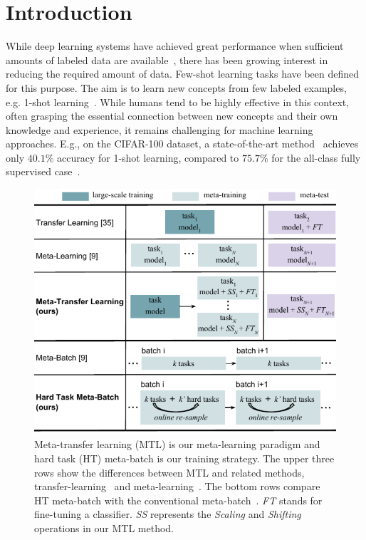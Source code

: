 \section{Introduction}

While deep learning systems have achieved great performance when sufficient amounts of labeled data are available~\cite{Lecun2015, HeZRS16, ShelhamerLD17},
there has been growing interest in reducing the required amount of data.
%
Few-shot learning tasks have been defined for this purpose. 
%
The aim is to learn new concepts from few labeled examples, e.g. 1-shot learning~\cite{FeiFeiFP06}.
%
While humans tend to be highly effective in this context, often grasping the essential connection between new concepts and their own knowledge and experience, it remains challenging for machine learning approaches.
E.g., on the CIFAR-100 dataset, a state-of-the-art method~\cite{OreshkinNIPS18} achieves only $40.1\%$ accuracy for 1-shot learning, compared to $75.7\%$ for the all-class fully supervised case~\cite{ClevertUH15}. 



\begin{figure}[t]
  \centering
  \includegraphics[width=0.99\linewidth]{figures/main_framework_tisser.pdf}
     \caption{Meta-transfer learning (MTL) is our meta-learning paradigm and hard task (HT) meta-batch is our training strategy. The upper three rows show the differences between MTL and related methods, transfer-learning~\cite{PanTKY11} and meta-learning~\cite{FinnAL17}.
     The bottom rows compare HT meta-batch with the conventional meta-batch~\cite{FinnAL17}. \emph{FT} stands for fine-tuning a classifier. \emph{SS} represents the \emph{Scaling} and \emph{Shifting} operations in our MTL method.}
  \label{main_framework_tisser}
  \vspace{-0.3cm}
\end{figure}

